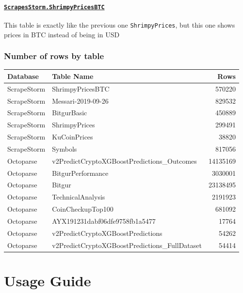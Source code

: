 \documentclass[]{book}
\begin{document}
\hypertarget{scrapesstorm.shrimpypricesbtc}{%
\subsubsection{\texorpdfstring{\href{https://predictcryptodb.com/question/9}{\textbf{\texttt{ScrapesStorm.ShrimpyPricesBTC}}}}{ScrapesStorm.ShrimpyPricesBTC}}\label{scrapesstorm.shrimpypricesbtc}}

This table is exactly like the previous one \texttt{ShrimpyPrices}, but this one shows prices in BTC instead of being in USD

\hypertarget{number-of-rows-by-table}{%
\subsection{Number of rows by table}\label{number-of-rows-by-table}}

\begin{tabular}{l|l|r}
\hline
Database & Table Name & Rows\\
\hline
ScrapeStorm & ShrimpyPricesBTC & 570220\\
\hline
ScrapeStorm & Messari-2019-09-26 & 829532\\
\hline
ScrapeStorm & BitgurBasic & 450889\\
\hline
ScrapeStorm & ShrimpyPrices & 299491\\
\hline
ScrapeStorm & KuCoinPrices & 38820\\
\hline
ScrapeStorm & Symbols & 817056\\
\hline
Octoparse & v2PredictCryptoXGBoostPredictions\_Outcomes & 14135169\\
\hline
Octoparse & BitgurPerformance & 3030001\\
\hline
Octoparse & Bitgur & 23138495\\
\hline
Octoparse & TechnicalAnalysis & 2191923\\
\hline
Octoparse & CoinCheckupTop100 & 681092\\
\hline
Octoparse & AYX191231dabf06dfe9758fb1a5477 & 17764\\
\hline
Octoparse & v2PredictCryptoXGBoostPredictions & 54262\\
\hline
Octoparse & v2PredictCryptoXGBoostPredictions\_FullDataset & 54414\\
\hline
\end{tabular}

\hypertarget{usage-guide}{%
\chapter{Usage Guide}\label{usage-guide}}
\end{document}
